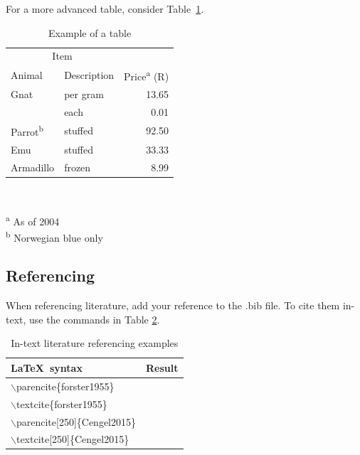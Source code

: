 \documentclass[a4paper,12pt]{article}
\begin{document}
For a more advanced table, consider Table~\ref{tab:tabexample}.

\begin{table}[htbp]
  \centering
  \caption{Example of a table}
  \label{tab:tabexample}
  \begin{minipage}{0.5\textwidth}
    \begin{centering}
      \begin{tabular}{@{}llr@{}} \toprule 
        \multicolumn{2}{c}{Item}                                               \\ 
        \cmidrule(r){1-2} 
        Animal                    & Description & Price\textsuperscript{a} (R) \\ 
        \midrule 
        Gnat                      & per gram    & \num{13.65}                  \\ 
                                  & each        & \num{0.01}                   \\ 
        Parrot\textsuperscript{b} & stuffed     & \num{92.50}                  \\ 
        Emu                       & stuffed     & \num{33.33}                  \\ 
        Armadillo                 & frozen      & \num{8.99}                   \\ 
        \bottomrule 
      \end{tabular}                                                            \\
    \end{centering} 
    \vspace{1em}
    \textsuperscript{a} As of 2004                                             \\
    \textsuperscript{b} Norwegian blue only
  \end{minipage}
\end{table}

\subsection{Referencing}


When referencing literature, add your reference to the .bib file. To cite them in-text, use the commands in Table \ref{tab:Cite}.

\begin{table}[!ht]
\centering
\caption{In-text literature referencing examples}
\label{tab:Cite}
\begin{tabular}{ll}
\toprule
\LaTeX\ syntax & Result\\
\midrule
$\backslash$parencite\{forster1955\} &\parencite{forster1955} \\
$\backslash$textcite\{forster1955\} & \textcite{forster1955} \\
$\backslash$parencite[250]\{Cengel2015\} &\parencite[250]{Cengel2015} \\
$\backslash$textcite[250]\{Cengel2015\} & \textcite[250]{Cengel2015} \\
\bottomrule
\end{tabular}
\end{table}
\end{document}

